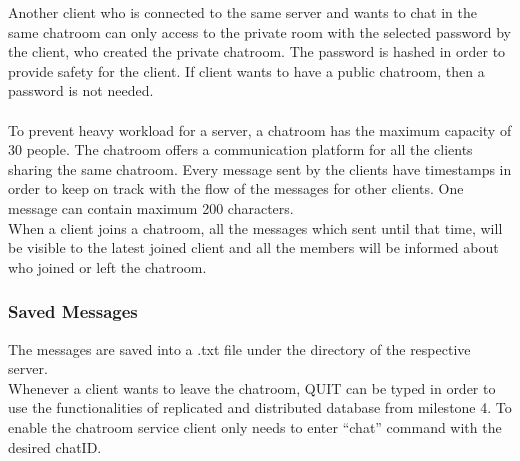 Another client who is connected to the same server and wants to chat in the same chatroom can only access to the private room with the selected password by the client, who created the private chatroom. The password is hashed in order to provide safety for the client. If client wants to have a public chatroom, then a password is not needed.\\
\\
To prevent heavy workload for a server, a chatroom has the maximum capacity of 30 people. The chatroom offers a communication platform for all the clients sharing the same chatroom. Every message sent by the clients have timestamps in order to keep on track with the flow of the messages for other clients. One message can contain maximum 200 characters.\\
When a client joins a chatroom, all the messages which sent until that time, will be visible to the latest joined client and all the members will be informed about who joined or left the chatroom. 
\subsubsection{Saved Messages}
\label{sec:groupchat_executionoftheworkflow_savedmessages}

The messages are saved into a .txt file under the directory of the respective server.\\

Whenever a client wants to leave the chatroom, QUIT can be typed in order to use the functionalities of replicated and distributed database from milestone 4. To enable the chatroom service client only needs to enter “chat” command with the desired chatID. 



